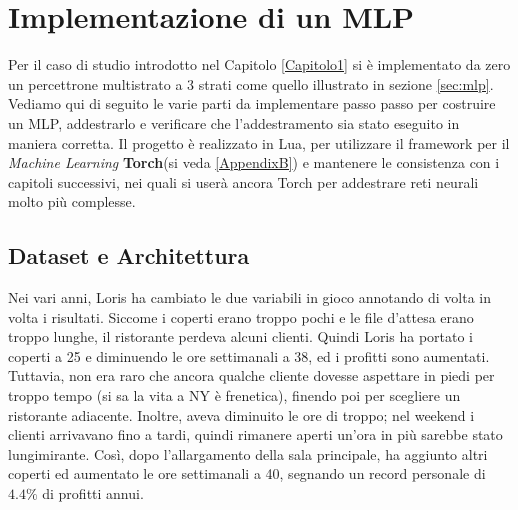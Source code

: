 \chapter{Implementazione di un MLP} %
\label{Capitolo2} %
\def \path {Figures/C1}
\def \teoria {Figures/teoria}

Per il caso di studio introdotto nel Capitolo \ref{Capitolo1} si è implementato da zero un percettrone multistrato a 3 strati come quello illustrato in sezione \ref{sec:mlp}. Vediamo qui di seguito le varie parti da implementare passo passo per costruire un MLP, addestrarlo e verificare che l'addestramento sia stato eseguito in maniera corretta. Il progetto è realizzato in Lua, per utilizzare il framework per il \emph{Machine Learning} \textbf{Torch}(si veda \ref{AppendixB}) e mantenere le consistenza con i capitoli successivi, nei quali si userà ancora Torch per addestrare reti neurali molto più complesse.

\section{Dataset e Architettura}
Nei vari anni, Loris ha cambiato le due variabili in gioco annotando di volta in volta i risultati. Siccome i coperti erano troppo pochi e le file d'attesa erano troppo lunghe, il ristorante perdeva alcuni clienti. Quindi Loris ha portato i coperti a 25 e diminuendo le ore settimanali a 38, ed i profitti sono aumentati. Tuttavia, non era raro che ancora qualche cliente dovesse aspettare in piedi per troppo tempo (si sa la vita a NY è frenetica), finendo poi per scegliere un ristorante adiacente. Inoltre, aveva diminuito le ore di troppo; nel weekend i clienti arrivavano fino a tardi, quindi rimanere aperti un'ora in più sarebbe stato lungimirante. Così, dopo l'allargamento della sala principale, ha aggiunto altri coperti ed aumentato le ore settimanali a 40, segnando un record personale di $4.4\%$ di profitti annui. \\


